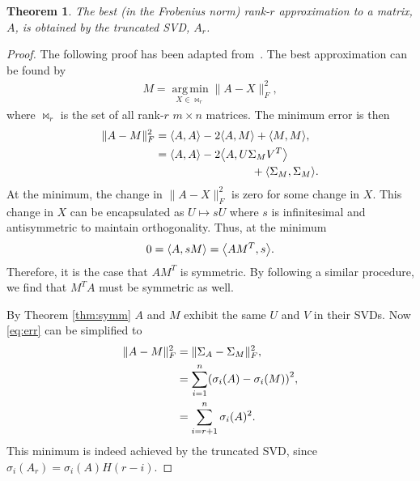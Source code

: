 \documentclass[11pt, a4paper, twocolumn]{article}
\let\originalleft\left
\let\originalright\right
\renewcommand{\left}{\mathopen{}\mathclose\bgroup\originalleft}
\renewcommand{\right}{\aftergroup\egroup\originalright}
\DeclareMathOperator{\argmin}{arg\,min}
\newtheorem{theorem}{Theorem}
\begin{document}
\begin{theorem}
The best (in the Frobenius norm) rank-$r$ approximation to a matrix, $A$, is obtained by the truncated SVD, $A_r$.
\end{theorem}
\begin{proof}
The following proof has been adapted from~\cite{eckart}. The best approximation can be found by
\begin{align}
M = \underset{X \in \bowtie_r}{\argmin} \| A - X \|_F^2,
\end{align}
where $\bowtie_r$ is the set of all rank-$r$ $m \times n$ matrices. The minimum error is then
\begin{align}
\label{eq:err}
\| A - M \|_F^2 &= \left< A, A \right> - 2 \left< A, M \right> + \left< M, M \right>, \\
&= \left< A, A \right> - 2 \left< A, U \Sigma_M V^T \right> \\
\nonumber & \hspace{3cm} + \left< \Sigma_M, \Sigma_M \right>.
\end{align}
At the minimum, the change in $\| A - X \|_F^2$ is zero for some change in $X$. This change in $X$ can be encapsulated as $U \mapsto sU$ where $s$ is infinitesimal and antisymmetric to maintain orthogonality. Thus, at the minimum
\begin{align}
0 = \left< A, s M \right> = \left< A M^T, s \right>.
\end{align}
Therefore, it is the case that $A M^T$ is symmetric. By following a similar procedure, we find that $M^T A$ must be symmetric as well.

By Theorem \ref{thm:symm} $A$ and $M$ exhibit the same $U$ and $V$ in their SVDs. Now \eqref{eq:err} can be simplified to
\begin{align}
\| A - M \|_F^2 &= \| \Sigma_A - \Sigma_M \|_F^2, \\
&= \sum_{i=1}^n \left( \sigma_i(A) - \sigma_i(M) \right)^2, \\
&= \sum_{i = r+1}^n \sigma_i(A)^2.
\end{align}
This minimum is indeed achieved by the truncated SVD, since $\sigma_i(A_r) = \sigma_i(A) H(r - i)$.
\end{proof}
\end{document}
